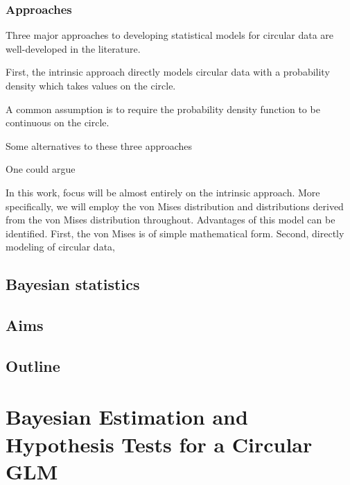 \documentclass[12pt, a4paper]{book}\usepackage[]{graphicx}\usepackage[]{color}
\begin{document}
\subsection{Approaches}

Three major approaches to developing statistical models for circular data are well-developed in the literature.

First, the intrinsic approach directly models circular data with a probability density which takes values on the circle.

A common assumption is to require the probability density function to be continuous on the circle.





Some alternatives to these three approaches

One could argue

In this work, focus will be almost entirely on the intrinsic approach. More specifically, we will employ the von Mises distribution and distributions derived from the von Mises distribution throughout. Advantages of this model can be identified. First, the von Mises is of simple mathematical form. Second, directly modeling of circular data,






\section{Bayesian statistics}




\section{Aims}



\section{Outline}







\chapter{Bayesian Estimation and Hypothesis Tests for a Circular GLM}
\label{circglm}

\end{document}
